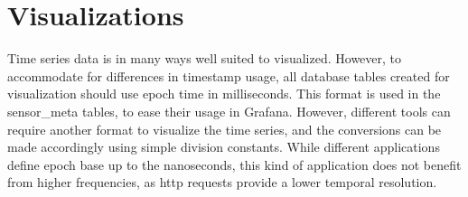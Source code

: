 \section{Visualizations}\label{sec:visuals}
Time series data is in many ways well suited to visualized. However,
to accommodate for differences in timestamp usage, all database tables created for visualization should use epoch time in milliseconds. This format is used in the sensor\_meta tables, to ease their usage in Grafana. However, different tools can require another format to visualize the time series, and the conversions can be made accordingly using simple division constants. While different applications define epoch base up to the nanoseconds, this kind of application does not benefit from higher frequencies, as http requests provide a lower temporal resolution. 

